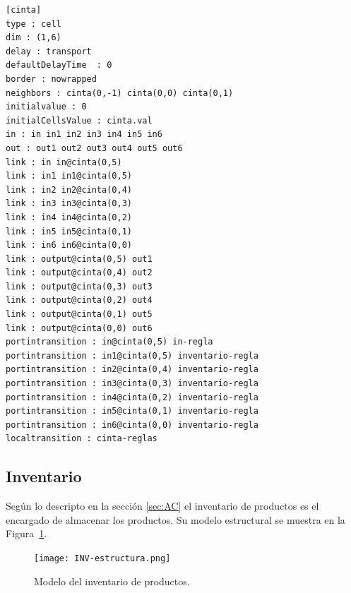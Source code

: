\documentclass[10pt]{article}
\begin{document}
\begin{minipage}{1\textwidth}
	\centering
	\begin{lstlisting}
[cinta]
type : cell
dim : (1,6)
delay : transport
defaultDelayTime  : 0
border : nowrapped
neighbors : cinta(0,-1) cinta(0,0) cinta(0,1)
initialvalue : 0
initialCellsValue : cinta.val
in : in in1 in2 in3 in4 in5 in6
out : out1 out2 out3 out4 out5 out6
link : in in@cinta(0,5)
link : in1 in1@cinta(0,5)
link : in2 in2@cinta(0,4)
link : in3 in3@cinta(0,3)
link : in4 in4@cinta(0,2)
link : in5 in5@cinta(0,1)
link : in6 in6@cinta(0,0)
link : output@cinta(0,5) out1
link : output@cinta(0,4) out2
link : output@cinta(0,3) out3
link : output@cinta(0,2) out4
link : output@cinta(0,1) out5
link : output@cinta(0,0) out6
portintransition : in@cinta(0,5) in-regla
portintransition : in1@cinta(0,5) inventario-regla
portintransition : in2@cinta(0,4) inventario-regla
portintransition : in3@cinta(0,3) inventario-regla
portintransition : in4@cinta(0,2) inventario-regla
portintransition : in5@cinta(0,1) inventario-regla
portintransition : in6@cinta(0,0) inventario-regla
localtransition : cinta-reglas
	\end{lstlisting}
\end{minipage}

\subsection{Inventario}\label{sec:IP}
Según lo descripto en la sección \ref{sec:AC} el inventario de productos es el encargado de almacenar los productos. Su modelo estructural se muestra en la Figura~\ref{fig:IP-estructura}.

\begin{figure}[h] 
	\centering 
	\texttt{[image: INV-estructura.png]} 
	\caption{Modelo del inventario de productos.} 
	\label{fig:IP-estructura} 
\end{figure}
\end{document}
